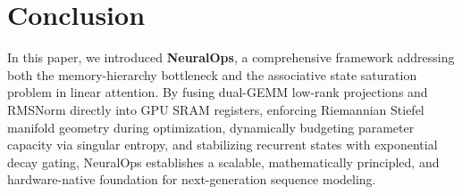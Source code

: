 \section{Conclusion}
\label{sec:conclusion}

In this paper, we introduced \textbf{NeuralOps}, a comprehensive framework addressing both the memory-hierarchy bottleneck and the associative state saturation problem in linear attention. By fusing dual-GEMM low-rank projections and RMSNorm directly into GPU SRAM registers, enforcing Riemannian Stiefel manifold geometry during optimization, dynamically budgeting parameter capacity via singular entropy, and stabilizing recurrent states with exponential decay gating, NeuralOps establishes a scalable, mathematically principled, and hardware-native foundation for next-generation sequence modeling.

